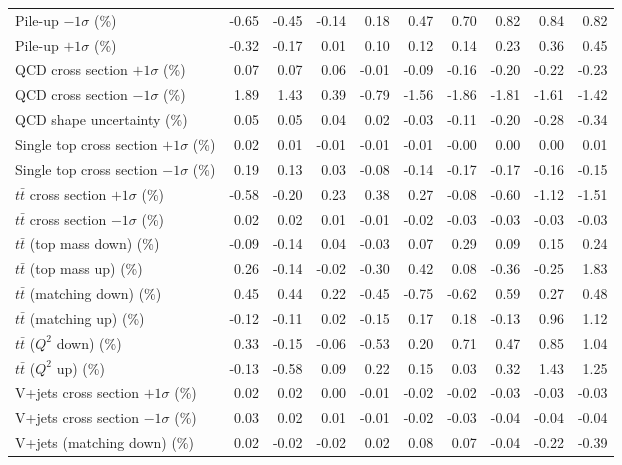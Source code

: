 \begin{table}[htbp]
{\begin{tabular}{lrrrrrrrrr}
Pile-up $-1\sigma$ (\%) & -0.65 & -0.45 & -0.14 & 0.18 & 0.47 & 0.70 & 0.82 & 0.84 & 0.82 \\ 
Pile-up $+1\sigma$ (\%) & -0.32 & -0.17 & 0.01 & 0.10 & 0.12 & 0.14 & 0.23 & 0.36 & 0.45 \\ 
QCD cross section \ensuremath{+1\sigma} (\%) & 0.07 & 0.07 & 0.06 & -0.01 & -0.09 & -0.16 & -0.20 & -0.22 & -0.23 \\ 
QCD cross section \ensuremath{-1\sigma} (\%) & 1.89 & 1.43 & 0.39 & -0.79 & -1.56 & -1.86 & -1.81 & -1.61 & -1.42 \\ 
QCD shape uncertainty (\%) & 0.05 & 0.05 & 0.04 & 0.02 & -0.03 & -0.11 & -0.20 & -0.28 & -0.34 \\ 
Single top cross section $+1\sigma$ (\%) & 0.02 & 0.01 & -0.01 & -0.01 & -0.01 & -0.00 & 0.00 & 0.00 & 0.01 \\ 
Single top cross section $-1\sigma$ (\%) & 0.19 & 0.13 & 0.03 & -0.08 & -0.14 & -0.17 & -0.17 & -0.16 & -0.15 \\ 
$t\bar{t}$ cross section $+1\sigma$ (\%) & -0.58 & -0.20 & 0.23 & 0.38 & 0.27 & -0.08 & -0.60 & -1.12 & -1.51 \\ 
$t\bar{t}$ cross section $-1\sigma$ (\%) & 0.02 & 0.02 & 0.01 & -0.01 & -0.02 & -0.03 & -0.03 & -0.03 & -0.03 \\ 
$t\bar{t}$ (top mass down) (\%) & -0.09 & -0.14 & 0.04 & -0.03 & 0.07 & 0.29 & 0.09 & 0.15 & 0.24 \\ 
$t\bar{t}$ (top mass up) (\%) & 0.26 & -0.14 & -0.02 & -0.30 & 0.42 & 0.08 & -0.36 & -0.25 & 1.83 \\ 
$t\bar{t}$ (matching down) (\%) & 0.45 & 0.44 & 0.22 & -0.45 & -0.75 & -0.62 & 0.59 & 0.27 & 0.48 \\ 
$t\bar{t}$ (matching up) (\%) & -0.12 & -0.11 & 0.02 & -0.15 & 0.17 & 0.18 & -0.13 & 0.96 & 1.12 \\ 
$t\bar{t}$ ($Q^{2}$ down) (\%) & 0.33 & -0.15 & -0.06 & -0.53 & 0.20 & 0.71 & 0.47 & 0.85 & 1.04 \\ 
$t\bar{t}$ ($Q^{2}$ up) (\%) & -0.13 & -0.58 & 0.09 & 0.22 & 0.15 & 0.03 & 0.32 & 1.43 & 1.25 \\ 
V+jets cross section \ensuremath{+1\sigma} (\%) & 0.02 & 0.02 & 0.00 & -0.01 & -0.02 & -0.02 & -0.03 & -0.03 & -0.03 \\ 
V+jets cross section \ensuremath{-1\sigma} (\%) & 0.03 & 0.02 & 0.01 & -0.01 & -0.02 & -0.03 & -0.04 & -0.04 & -0.04 \\ 
V+jets (matching down) (\%) & 0.02 & -0.02 & -0.02 & 0.02 & 0.08 & 0.07 & -0.04 & -0.22 & -0.39 \\ 

\end{tabular}}
\end{table}
